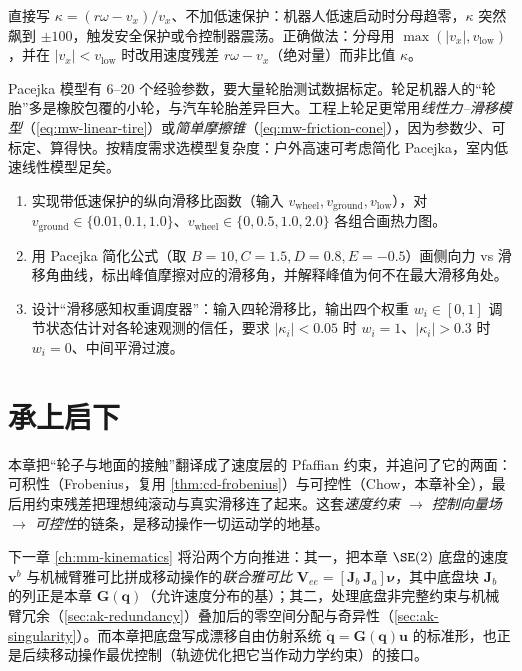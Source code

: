 \begin{pitfall}
直接写 $\kappa=(r\omega-v_x)/v_x$、不加低速保护：机器人低速启动时分母趋零，$\kappa$ 突然飙到 $\pm100$，触发安全保护或令控制器震荡。正确做法：分母用 $\max(|v_x|,v_{\text{low}})$，并在 $|v_x|<v_{\text{low}}$ 时改用速度残差 $r\omega-v_x$（绝对量）而非比值 $\kappa$。
\end{pitfall}

\begin{pitfall}
Pacejka 模型有 $6$–$20$ 个经验参数，要大量轮胎测试数据标定。轮足机器人的“轮胎”多是橡胶包覆的小轮，与汽车轮胎差异巨大。工程上轮足更常用\emph{线性力--滑移模型}（\cref{eq:mw-linear-tire}）或\emph{简单摩擦锥}（\cref{eq:mw-friction-cone}），因为参数少、可标定、算得快。按精度需求选模型复杂度：户外高速可考虑简化 Pacejka，室内低速线性模型足矣。
\end{pitfall}

\begin{practice}
\begin{enumerate}
  \item 实现带低速保护的纵向滑移比函数（输入 $v_{\text{wheel}},v_{\text{ground}},v_{\text{low}}$），对 $v_{\text{ground}}\in\{0.01,0.1,1.0\}$、$v_{\text{wheel}}\in\{0,0.5,1.0,2.0\}$ 各组合画热力图。
  \item 用 Pacejka 简化公式（取 $B=10,C=1.5,D=0.8,E=-0.5$）画侧向力 vs 滑移角曲线，标出峰值摩擦对应的滑移角，并解释峰值为何不在最大滑移角处。
  \item 设计“滑移感知权重调度器”：输入四轮滑移比，输出四个权重 $w_i\in[0,1]$ 调节状态估计对各轮速观测的信任，要求 $|\kappa_i|<0.05$ 时 $w_i=1$、$|\kappa_i|>0.3$ 时 $w_i=0$、中间平滑过渡。
\end{enumerate}
\end{practice}

\section{承上启下}
\label{sec:mw-bridge}

本章把“轮子与地面的接触”翻译成了速度层的 Pfaffian 约束，并追问了它的两面：可积性（Frobenius，复用 \cref{thm:cd-frobenius}）与可控性（Chow，本章补全），最后用约束残差把理想纯滚动与真实滑移连了起来。这套\emph{速度约束 $\to$ 控制向量场 $\to$ 可控性}的链条，是移动操作一切运动学的地基。

下一章 \cref{ch:mm-kinematics} 将沿两个方向推进：其一，把本章 $\SE(2)$ 底盘的速度 $\mathbf{v}^b$ 与机械臂雅可比拼成移动操作的\emph{联合雅可比} $\mathbf{V}_{ee}=[\mathbf{J}_b\ \mathbf{J}_a]\boldsymbol{\nu}$，其中底盘块 $\mathbf{J}_b$ 的列正是本章 $\mathbf{G}(\mathbf{q})$（允许速度分布的基）；其二，处理底盘非完整约束与机械臂冗余（\cref{sec:ak-redundancy}）叠加后的零空间分配与奇异性（\cref{sec:ak-singularity}）。而本章把底盘写成漂移自由仿射系统 $\dot{\mathbf{q}}=\mathbf{G}(\mathbf{q})\mathbf{u}$ 的标准形，也正是后续移动操作最优控制（轨迹优化把它当作动力学约束）的接口。


